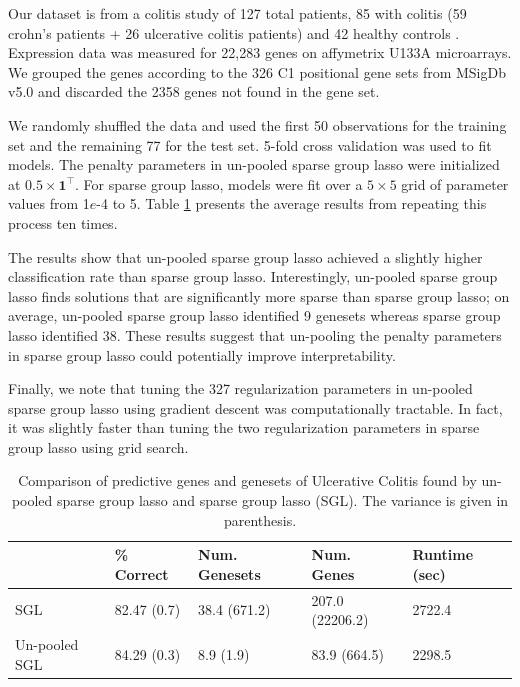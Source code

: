 \documentclass[12pt,letterpaper]{article}
\begin{document}
Our dataset is from a colitis study of 127 total patients, 85 with colitis (59 crohn's patients + 26 ulcerative colitis patients) and 42 healthy controls \citep{burczynski2006molecular}. Expression data was measured for 22,283 genes on affymetrix U133A microarrays. We grouped the genes according to the 326 C1 positional gene sets from MSigDb v5.0 \citep{subramanian2005gene} and discarded the 2358 genes not found in the gene set.

We randomly shuffled the data and used the first 50 observations for the training set and the remaining 77 for the test set. 5-fold cross validation was used to fit models. The penalty parameters in un-pooled sparse group lasso were initialized at $0.5 \times \boldsymbol 1^\top$. For sparse group lasso, models were fit over a $5 \times 5$ grid of parameter values from 1$e$-4 to 5. Table \ref{colitis} presents the average results from repeating this process ten times.

The results show that un-pooled sparse group lasso achieved a slightly higher classification rate than sparse group lasso. Interestingly, un-pooled sparse group lasso finds solutions that are significantly more sparse than sparse group lasso; on average, un-pooled sparse group lasso identified 9 genesets whereas sparse group lasso identified 38. These results suggest that un-pooling the penalty parameters in sparse group lasso could potentially improve interpretability.

Finally, we note that tuning the 327 regularization parameters in un-pooled sparse group lasso using gradient descent was computationally tractable. In fact, it was slightly faster than tuning the two regularization parameters in sparse group lasso using grid search.

\begin{table}
\begin{center}
\begin{tabular}{| l | l | l | l | l | }
\hline
 & \% Correct  & Num. Genesets & Num. Genes & Runtime (sec) \\
\hline
SGL & 82.47 (0.7) & 38.4 (671.2) & 207.0 (22206.2) & 2722.4 \\
\hline
Un-pooled SGL & 84.29 (0.3) & 8.9 (1.9) & 83.9 (664.5) & 2298.5 \\
\hline
\end{tabular}
\end{center}
\caption {Comparison of predictive genes and genesets of Ulcerative Colitis found by un-pooled sparse group lasso and sparse group lasso (SGL). The variance is given in parenthesis.}
\label{colitis}
\end{table}
\end{document}

